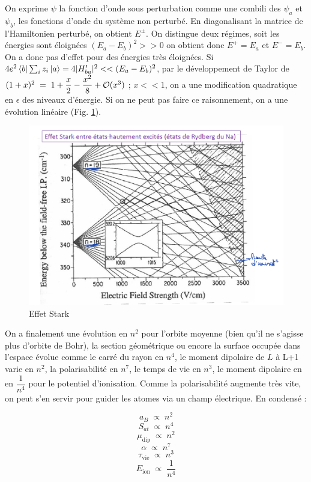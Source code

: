 On exprime $\psi$ la fonction d'onde sous perturbation comme une combili des $\psi_a$ et $\psi_b$, les fonctions d'onde du système non perturbé. En diagonalisant la matrice de l'Hamiltonien perturbé, on obtient $E^{\pm}$. On distingue deux régimes, soit les énergies sont éloignées $(E_a - E_b)^2 >> 0$ on obtient donc $E^+ = E_a$ et $E^- = E_b$. On a donc pas d'effet pour des énergies très éloignées. Si $4e^2\bra{b}\sum_iz_i\ket{a} = 4|H'_{ba}|^2<<(E_a - E_b)^2 $, par le développement de Taylor de $(1 + x)^2\; = \; 1 + \dfrac{x}{2} - \dfrac{x^2}{8} + \mathcal{O}(x^3)$ ; $x<<1$, on a une modification quadratique en $\epsilon$ des niveaux d'énergie. Si on ne peut pas faire ce raisonnement, on a une évolution linéaire (Fig. \ref{fig:stark_lin}).

\begin{figure}[htp]
    \centering
    \includegraphics[scale=0.7]{Images2/GrapheStark.PNG}
    \caption{Effet Stark}
    \label{fig:stark_lin}
\end{figure}

On a finalement une évolution en $n^2$ pour l'orbite moyenne (bien qu'il ne s'agisse plus d'orbite de Bohr), la section géométrique ou encore la surface occupée dans l'espace évolue comme le carré du rayon en $n^4$, le moment dipolaire de $L$ à L+1 varie en $n^2$, la polarisabilité en $n^7$, le temps de vie en $n^3$, le moment dipolaire en en $\dfrac{1}{n^4}$ pour le potentiel d'ionisation. Comme la polarisabilité augmente très vite, on peut s'en servir pour guider les atomes via un champ électrique. En condensé :

\[
    a_B \; \propto\; n^2
\]
\[
    S_{at} \; \propto\; n^4
\]
\[
    \mu_\text{dip} \; \propto\; n^2
\]
\[
    \alpha \; \propto\; n^7
\]
\[
    \tau_\text{vie} \; \propto\; n^3
\]
\[
    E_\text{ion} \; \propto\; \dfrac{1}{n^4}
\]

